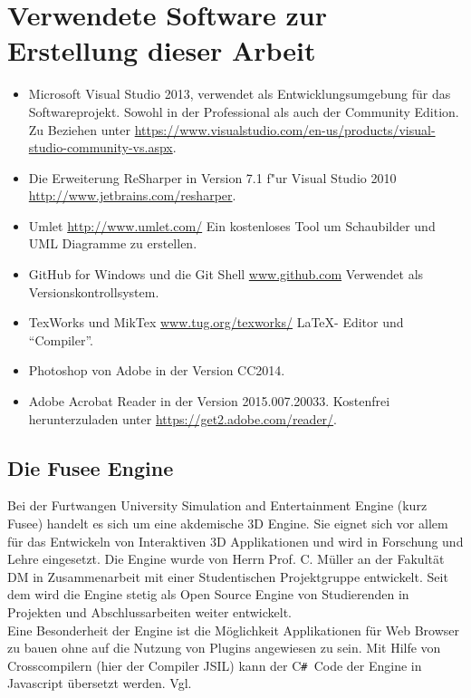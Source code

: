 \documentclass[pagesize, paper=a4, fontsize=12pt, titlepage=true, headings=small, headnosepline, abstractoff, liststotoc, nochapterprefix, plainheadsepline, twoside]{scrreprt}
\newcommand{\CSS}{C\texttt{\# }}
\begin{document}
\section{Verwendete Software zur Erstellung dieser Arbeit}
\begin{itemize}
\item Microsoft Visual Studio 2013, \newline verwendet als Entwicklungsumgebung für das Softwareprojekt. Sowohl in der Professional als auch der Community Edition. Zu Beziehen unter  \url{https://www.visualstudio.com/en-us/products/visual-studio-community-vs.aspx}.
\item Die Erweiterung ReSharper in Version 7.1 f"ur Visual Studio 2010 \url{http://www.jetbrains.com/resharper}.
\item Umlet \url{http://www.umlet.com/} \newline Ein kostenloses Tool um Schaubilder und UML Diagramme zu erstellen.
\item GitHub for Windows und die Git Shell \url{www.github.com} \newline Verwendet als Versionskontrollsystem.
\item TexWorks und MikTex \url{www.tug.org/texworks/} \newline \LaTeX- Editor und “Compiler”.
\item Photoshop von Adobe in der Version CC2014.
\item Adobe Acrobat Reader in der Version 2015.007.20033. Kostenfrei herunterzuladen unter \url{https://get2.adobe.com/reader/}.
\end{itemize}

\subsection{Die Fusee Engine}
Bei der Furtwangen University Simulation and Entertainment Engine (kurz Fusee) handelt es sich um eine akdemische 3D Engine. Sie eignet sich vor allem für das Entwickeln von Interaktiven 3D Applikationen und wird in Forschung und Lehre eingesetzt. Die Engine wurde von Herrn Prof. C. Müller an der Fakultät DM in Zusammenarbeit mit einer Studentischen Projektgruppe entwickelt. Seit dem wird die Engine stetig als Open Source Engine von Studierenden in Projekten und Abschlussarbeiten weiter entwickelt.\\

Eine Besonderheit der Engine ist die Möglichkeit Applikationen für Web Browser zu bauen ohne auf die Nutzung von Plugins angewiesen zu sein. Mit Hilfe von Crosscompilern (hier der Compiler JSIL) kann der \CSS Code der Engine in Javascript übersetzt werden. Vgl.  \\
\end{document}
